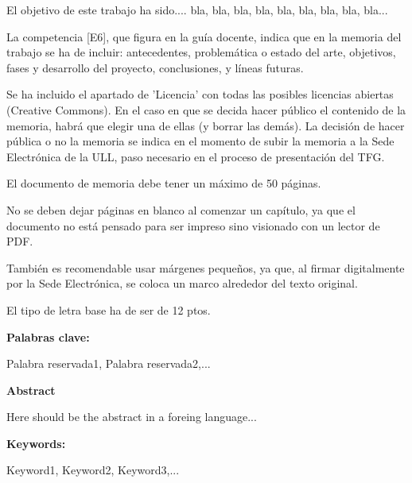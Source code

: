\documentclass[a4paper,12pt,oneside]{scrbook}
\newenvironment{abstract}[1][\abstractname]{
    \cleardoublepageusingstyle{empty}
    \thispagestyle{empty}
    \begin{center}\textbf{#1}\end{center}
    \begin{itshape}\par\noindent%
}
{\end{itshape}}
\newenvironment{keywords}[1][Keywords]
{\vspace{7pt}\par\noindent\textup{\textbf{#1: }}\begin{upshape}}
{\end{upshape}}
\begin{document}
\begin{abstract}
El objetivo de este trabajo ha sido.... bla, bla, bla, bla, bla, bla, bla, bla, bla...

La competencia [E6], que figura en la guía docente, indica que en la memoria del trabajo se ha de incluir: antecedentes, problemática o estado del arte, objetivos, fases y desarrollo del proyecto, conclusiones, y líneas futuras.

Se ha incluido el apartado de 'Licencia' con todas las posibles licencias abiertas (Creative Commons). En el caso en que se decida hacer público el contenido de la memoria, habrá que elegir una de ellas (y borrar las demás). La decisión de hacer pública o no la memoria se indica en el momento de subir la memoria a la Sede Electrónica de la ULL, paso necesario en el proceso de presentación del TFG.

El documento de memoria debe tener un máximo de 50 páginas.

No se deben dejar páginas en blanco al comenzar un capítulo, ya que el documento no está pensado para ser impreso sino visionado con un lector de PDF.

También es recomendable usar márgenes pequeños, ya que, al firmar digitalmente por la Sede Electrónica, se coloca un marco alrededor del texto original.

El tipo de letra base ha de ser de 12 ptos.

\begin{keywords}[Palabras clave]
Palabra reservada1, Palabra reservada2,...
\end{keywords}
\end{abstract}

\thispagestyle{empty}

\begin{abstract}[Abstract]
Here should be the abstract in a foreing language...

\begin {keywords}
Keyword1, Keyword2, Keyword3,...
\end{keywords}
\end{abstract}

\pagestyle{plain}
\cleardoublepage
\setcounter{page}{1} 

\tableofcontents
\listoffigures
\listoftables
\end{document}
